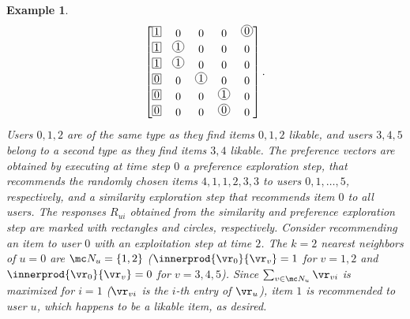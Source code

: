\documentclass{article}
\newtheorem{example}{Example}
\newcommand\vocrating{\vr}
\newcommand\ocR{R}
\begin{document}
\begin{example}
\begin{align*}
\begin{bmatrix}
\tikz \node (r1) at (0,-0.5cm) [shape=rectangle,draw,inner sep =0.05cm,outer sep=-0.1cm] {$1$}; & 0 & 0 & 0 &  \tikz \node (r1) at (0,-0.5cm) [shape=circle,draw,inner sep =0.03cm] {$0$}; \\
\tikz \node (r1) at (0,-0.5cm) [shape=rectangle,draw,inner sep =0.05cm] {$1$}; & \tikz \node (r1) at (0,-0.5cm) [shape=circle,draw,inner sep =0.03cm] {$1$}; & 0 & 0 & 0 \\
\tikz \node (r1) at (0,-0.5cm) [shape=rectangle,draw,inner sep =0.05cm] {$1$}; & \tikz \node (r1) at (0,-0.5cm) [shape=circle,draw,inner sep =0.03cm] {$1$}; & 0 & 0 & 0 \\
\tikz \node (r1) at (0,-0.5cm) [shape=rectangle,draw,inner sep =0.05cm] {$0$}; & 0 & \tikz \node (r1) at (0,-0.5cm) [shape=circle,draw,inner sep =0.03cm] {$1$}; & 0 & 0 \\
\tikz \node (r1) at (0,-0.5cm) [shape=rectangle,draw,inner sep =0.05cm] {$0$}; & 0 & 0 & \tikz \node (r1) at (0,-0.5cm) [shape=circle,draw,inner sep =0.03cm] {$1$}; & 0 \\
\tikz \node (r1) at (0,-0.5cm) [shape=rectangle,draw,inner sep =0.05cm] {$0$}; & 0 & 0 & \tikz \node (r1) at (0,-0.5cm) [shape=circle,draw,inner sep =0.03cm] {$0$}; & 0 
\end{bmatrix}.
\end{align*}
Users $0,1,2$ are of the same type as they find items $0,1,2$ likable, and users $3,4,5$ belong to a second type as they find items $3,4$ likable. 
The preference vectors are obtained by executing at time step $0$ a preference exploration step, that recommends the randomly chosen items $4,1,1,2,3,3$ to users $0,1,\ldots,5$, respectively, 
and a similarity exploration step that recommends item $0$ to all users. 
The responses $\ocR_{ui}$ obtained from the similarity and preference exploration step are marked with rectangles and circles, respectively. 
Consider recommending an item to user $0$ with an exploitation step at time $2$. The $k=2$ nearest neighbors of $u=0$ are $\mc N_u = \{1,2\}$ ($\innerprod{\vocrating_0}{\vocrating_v} = 1$ for $v=1,2$ and $\innerprod{\vocrating_0}{\vocrating_v} = 0$ for $v=3,4,5$). Since $\sum_{v \in \mc N_u} \vocrating_{vi}$ is maximized for $i=1$ ($\vocrating_{vi}$ is the $i$-th entry of $\vr_u$), item $1$ is recommended to user $u$, which happens to be a likable item, as desired. 
\end{example}
\end{document}
